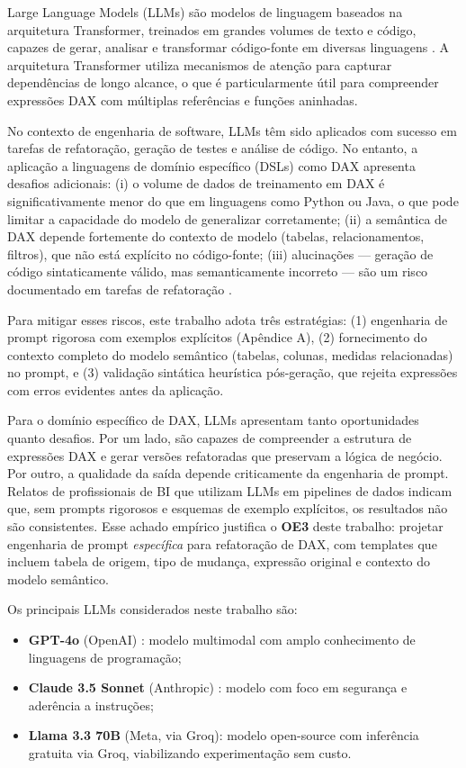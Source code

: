 \documentclass[
    12pt,               %
    openright,          %
    oneside,            %
    a4paper,            %
    chapter=TITLE,      %
    section=TITLE,      %
    brazil              %
]{abntex2}
\begin{document}
Large Language Models (LLMs) são modelos de linguagem baseados na arquitetura Transformer, treinados em grandes volumes de texto e código, capazes de gerar, analisar e transformar código-fonte em diversas linguagens \cite{openai2024gpt4}. A arquitetura Transformer utiliza mecanismos de atenção para capturar dependências de longo alcance, o que é particularmente útil para compreender expressões DAX com múltiplas referências e funções aninhadas.

No contexto de engenharia de software, LLMs têm sido aplicados com sucesso em tarefas de refatoração, geração de testes e análise de código. No entanto, a aplicação a linguagens de domínio específico (DSLs) como DAX apresenta desafios adicionais: (i) o volume de dados de treinamento em DAX é significativamente menor do que em linguagens como Python ou Java, o que pode limitar a capacidade do modelo de generalizar corretamente; (ii) a semântica de DAX depende fortemente do contexto de modelo (tabelas, relacionamentos, filtros), que não está explícito no código-fonte; (iii) alucinações — geração de código sintaticamente válido, mas semanticamente incorreto — são um risco documentado em tarefas de refatoração \cite{icse2025llmrefactor}.

Para mitigar esses riscos, este trabalho adota três estratégias: (1) engenharia de prompt rigorosa com exemplos explícitos (Apêndice A), (2) fornecimento do contexto completo do modelo semântico (tabelas, colunas, medidas relacionadas) no prompt, e (3) validação sintática heurística pós-geração, que rejeita expressões com erros evidentes antes da aplicação.

Para o domínio específico de DAX, LLMs apresentam tanto oportunidades quanto desafios. Por um lado, são capazes de compreender a estrutura de expressões DAX e gerar versões refatoradas que preservam a lógica de negócio. Por outro, a qualidade da saída depende criticamente da engenharia de prompt. Relatos de profissionais de BI que utilizam LLMs em pipelines de dados indicam que, sem prompts rigorosos e esquemas de exemplo explícitos, os resultados não são consistentes. Esse achado empírico justifica o \textbf{OE3} deste trabalho: projetar engenharia de prompt \textit{específica} para refatoração de DAX, com templates que incluem tabela de origem, tipo de mudança, expressão original e contexto do modelo semântico.

Os principais LLMs considerados neste trabalho são:

\begin{itemize}
    \item \textbf{GPT-4o} (OpenAI) \cite{openai2024gpt4}: modelo multimodal com amplo conhecimento de linguagens de programação;
    \item \textbf{Claude 3.5 Sonnet} (Anthropic) \cite{anthropic2025claude}: modelo com foco em segurança e aderência a instruções;
    \item \textbf{Llama 3.3 70B} (Meta, via Groq): modelo open-source com inferência gratuita via Groq, viabilizando experimentação sem custo.
\end{itemize}
\end{document}
